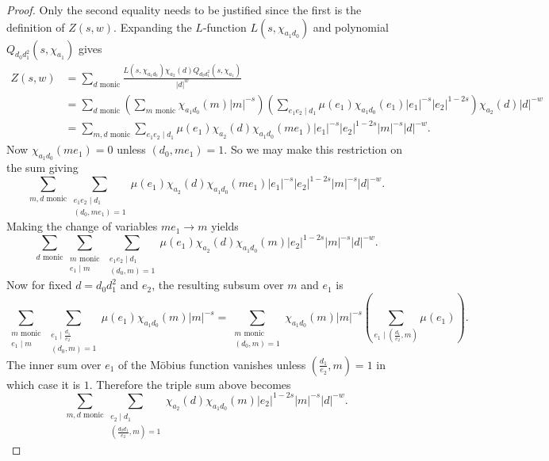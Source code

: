 \documentclass[12pt,reqno,oneside]{amsart}
\begin{document}
    \begin{proof}
        Only the second equality needs to be justified since the first is the definition of $Z(s,w)$. Expanding the $L$-function $L(s,\chi_{a_{1}d_{0}})$ and polynomial $Q_{d_{0}d_{1}^{2}}(s,\chi_{a_{1}})$ gives
        \begin{align*}
            Z(s,w) &= \sum_{\text{$d$ monic}}\frac{L(s,\chi_{a_{1}d_{0}})\chi_{a_{2}}(d)Q_{d_{0}d_{1}^{2}}(s,\chi_{a_{1}})}{|d|^{w}} \\
            &= \sum_{\text{$d$ monic}}\left(\sum_{\text{$m$ monic}}\chi_{a_{1}d_{0}}(m)|m|^{-s}\right)\left(\sum_{e_{1}e_{2} \mid d_{1}}\mu(e_{1})\chi_{a_{1}d_{0}}(e_{1})|e_{1}|^{-s}|e_{2}|^{1-2s}\right)\chi_{a_{2}}(d)|d|^{-w} \\
            &= \sum_{\text{$m,d$ monic}}\sum_{e_{1}e_{2} \mid d_{1}}\mu(e_{1})\chi_{a_{2}}(d)\chi_{a_{1}d_{0}}(me_{1})|e_{1}|^{-s}|e_{2}|^{1-2s}|m|^{-s}|d|^{-w}.
        \end{align*}
        Now $\chi_{a_{1}d_{0}}(me_{1}) = 0$ unless $(d_{0},me_{1}) = 1$. So we may make this restriction on the sum giving
        \[
            \sum_{\text{$m,d$ monic}}\sum_{\substack{e_{1}e_{2} \mid d_{1} \\ (d_{0},me_{1}) = 1}}\mu(e_{1})\chi_{a_{2}}(d)\chi_{a_{1}d_{0}}(me_{1})|e_{1}|^{-s}|e_{2}|^{1-2s}|m|^{-s}|d|^{-w}.
        \]
        Making the change of variables $me_{1} \to m$ yields
        \[
            \sum_{\text{$d$ monic}}\sum_{\substack{\text{$m$ monic} \\ e_{1} \mid m}}\sum_{\substack{e_{1}e_{2} \mid d_{1} \\ (d_{0},m) = 1}}\mu(e_{1})\chi_{a_{2}}(d)\chi_{a_{1}d_{0}}(m)|e_{2}|^{1-2s}|m|^{-s}|d|^{-w}.
        \]
        Now for fixed $d = d_{0}d_{1}^{2}$ and $e_{2}$, the resulting subsum over $m$ and $e_{1}$ is
        \[
            \sum_{\substack{\text{$m$ monic} \\ e_{1} \mid m}}\sum_{\substack{e_{1} \mid \frac{d_{1}}{e_{2}} \\ (d_{0},m) = 1}}\mu(e_{1})\chi_{a_{1}d_{0}}(m)|m|^{-s} = \sum_{\substack{\text{$m$ monic} \\ (d_{0},m) = 1}}\chi_{a_{1}d_{0}}(m)|m|^{-s}\left(\sum_{e_{1} \mid \left(\frac{d_{1}}{e_{2}},m\right)}\mu(e_{1})\right).
        \]
        The inner sum over $e_{1}$ of the M\"obius function vanishes unless $\left(\frac{d_{1}}{e_{2}},m\right) = 1$ in which case it is $1$. Therefore the triple sum above becomes
        \[
            \sum_{\text{$m,d$ monic}}\sum_{\substack{e_{2} \mid d_{1} \\ \left(\frac{d_{0}d_{1}}{e_{2}},m\right) = 1}}\chi_{a_{2}}(d)\chi_{a_{1}d_{0}}(m)|e_{2}|^{1-2s}|m|^{-s}|d|^{-w}.
\]
\end{proof}
\end{document}

